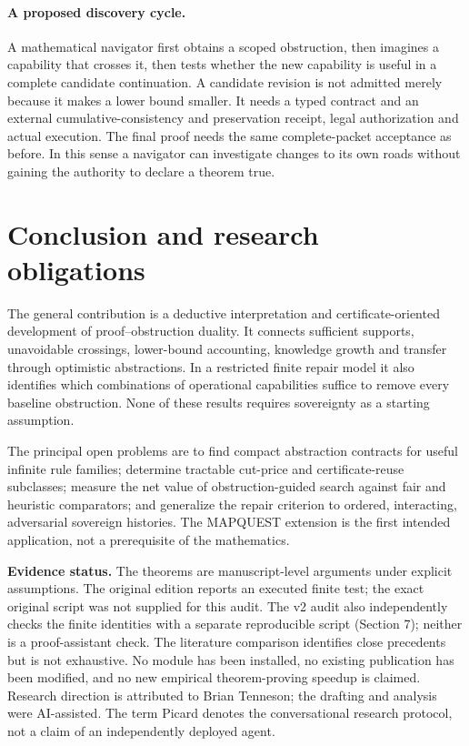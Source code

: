 \documentclass[11pt]{article}
\theoremstyle{remark}\newtheorem{remark}[theorem]{Remark}
\begin{document}
\paragraph{A proposed discovery cycle.} A mathematical navigator first obtains a scoped obstruction, then imagines a capability that crosses it, then tests whether the new capability is useful in a complete candidate continuation. A candidate revision is not admitted merely because it makes a lower bound smaller. It needs a typed contract and an external cumulative-consistency and preservation receipt, legal authorization and actual execution. The final proof needs the same complete-packet acceptance as before. In this sense a navigator can investigate changes to its own roads without gaining the authority to declare a theorem true.

\section{Conclusion and research obligations}
The general contribution is a deductive interpretation and certificate-oriented development of proof--obstruction duality. It connects sufficient supports, unavoidable crossings, lower-bound accounting, knowledge growth and transfer through optimistic abstractions. In a restricted finite repair model it also identifies which combinations of operational capabilities suffice to remove every baseline obstruction. None of these results requires sovereignty as a starting assumption.

The principal open problems are to find compact abstraction contracts for useful infinite rule families; determine tractable cut-price and certificate-reuse subclasses; measure the net value of obstruction-guided search against fair and heuristic comparators; and generalize the repair criterion to ordered, interacting, adversarial sovereign histories. The MAPQUEST extension is the first intended application, not a prerequisite of the mathematics.

\noindent\textbf{Evidence status.} The theorems are manuscript-level arguments under explicit assumptions. The original edition reports an executed finite test; the exact original script was not supplied for this audit. The v2 audit also independently checks the finite identities with a separate reproducible script (Section 7); neither is a proof-assistant check. The literature comparison identifies close precedents but is not exhaustive. No module has been installed, no existing publication has been modified, and no new empirical theorem-proving speedup is claimed. Research direction is attributed to Brian Tenneson; the drafting and analysis were AI-assisted. The term Picard denotes the conversational research protocol, not a claim of an independently deployed agent.
\end{document}
